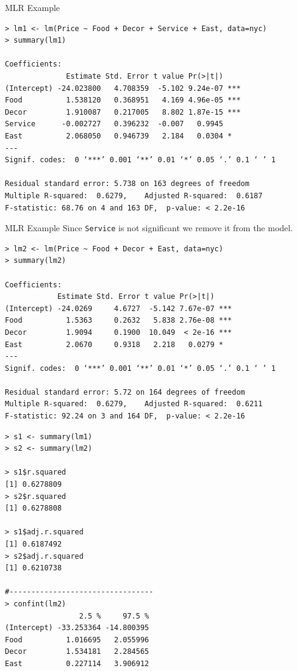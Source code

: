 \documentclass[10pt]{beamer}
\begin{document}
\begin{frame}[fragile]{MLR Example}
\small
\begin{verbatim}
> lm1 <- lm(Price ~ Food + Decor + Service + East, data=nyc)
> summary(lm1)

Coefficients:
              Estimate Std. Error t value Pr(>|t|)    
(Intercept) -24.023800   4.708359  -5.102 9.24e-07 ***
Food          1.538120   0.368951   4.169 4.96e-05 ***
Decor         1.910087   0.217005   8.802 1.87e-15 ***
Service      -0.002727   0.396232  -0.007   0.9945    
East          2.068050   0.946739   2.184   0.0304 *  
---
Signif. codes:  0 ‘***’ 0.001 ‘**’ 0.01 ‘*’ 0.05 ‘.’ 0.1 ‘ ’ 1

Residual standard error: 5.738 on 163 degrees of freedom
Multiple R-squared:  0.6279,	Adjusted R-squared:  0.6187 
F-statistic: 68.76 on 4 and 163 DF,  p-value: < 2.2e-16
\end{verbatim}
\end{frame}

\begin{frame}[fragile]{MLR Example}
Since \texttt{Service} is not significant we remove it from the model.
\small
\begin{verbatim}
> lm2 <- lm(Price ~ Food + Decor + East, data=nyc)
> summary(lm2)

Coefficients:
            Estimate Std. Error t value Pr(>|t|)    
(Intercept) -24.0269     4.6727  -5.142 7.67e-07 ***
Food          1.5363     0.2632   5.838 2.76e-08 ***
Decor         1.9094     0.1900  10.049  < 2e-16 ***
East          2.0670     0.9318   2.218   0.0279 *  
---
Signif. codes:  0 ‘***’ 0.001 ‘**’ 0.01 ‘*’ 0.05 ‘.’ 0.1 ‘ ’ 1

Residual standard error: 5.72 on 164 degrees of freedom
Multiple R-squared:  0.6279,	Adjusted R-squared:  0.6211 
F-statistic: 92.24 on 3 and 164 DF,  p-value: < 2.2e-16
\end{verbatim}
\end{frame}

\begin{frame}[fragile]
\small
\begin{verbatim}
> s1 <- summary(lm1)
> s2 <- summary(lm2)

> s1$r.squared
[1] 0.6278809
> s2$r.squared
[1] 0.6278808
 
> s1$adj.r.squared
[1] 0.6187492
> s2$adj.r.squared
[1] 0.6210738

#---------------------------------
> confint(lm2) 
                 2.5 %     97.5 %
(Intercept) -33.253364 -14.800395
Food          1.016695   2.055996
Decor         1.534181   2.284565
East          0.227114   3.906912
\end{verbatim}
\end{frame}
\end{document}
